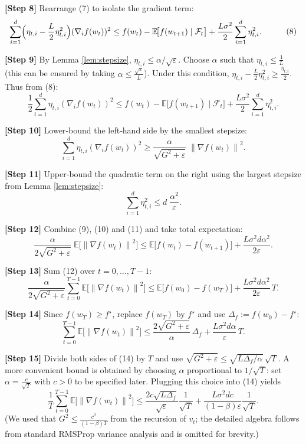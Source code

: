 \documentclass{article}
\newcommand{\E}{\mathbb{E}}
\newcommand{\norm}[1]{\left\lVert #1\right\rVert}
\begin{document}
\noindent\textbf{[Step 8]} Rearrange (7) to isolate the gradient term:
\[
\begin{aligned}
\sum_{i=1}^d \Bigl(\eta_{t,i}
   -\frac{L}{2}\eta_{t,i}^2\Bigr)(\nabla_i f(w_t))^2
&\le f(w_t)-\E\!\big[f(w_{t+1})\mid\mathcal F_t\big]
   +\frac{L\sigma^2}{2}\sum_{i=1}^d \eta_{t,i}^2 .
\end{aligned}
\tag{8}
\]

\noindent\textbf{[Step 9]} By Lemma \ref{lem:stepsize}, $\eta_{t,i}\le\alpha/\sqrt{\varepsilon}$.
Choose $\alpha$ such that $\eta_{t,i}\le\frac{1}{L}$ (this can be ensured by taking
$\alpha\le \frac{\sqrt{\varepsilon}}{L}$).  Under this condition,
$\eta_{t,i}-\frac{L}{2}\eta_{t,i}^2\ge\frac{\eta_{t,i}}{2}$.
Thus from (8):
\[
\frac{1}{2}\sum_{i=1}^d \eta_{t,i}(\nabla_i f(w_t))^2
\le f(w_t)-\E\!\big[f(w_{t+1})\mid\mathcal F_t\big]
   +\frac{L\sigma^2}{2}\sum_{i=1}^d \eta_{t,i}^2 .
\tag{9}
\]

\noindent\textbf{[Step 10]} Lower‑bound the left‑hand side by the smallest stepsize:
\[
\sum_{i=1}^d \eta_{t,i}(\nabla_i f(w_t))^2
\ge \frac{\alpha}{\sqrt{G^2+\varepsilon}}\;\norm{\nabla f(w_t)}^2 .
\tag{10}
\]

\noindent\textbf{[Step 11]} Upper‑bound the quadratic term on the right using the
largest stepsize from Lemma \ref{lem:stepsize}:
\[
\sum_{i=1}^d \eta_{t,i}^2 \le d\;\frac{\alpha^2}{\varepsilon}.
\tag{11}
\]

\noindent\textbf{[Step 12]} Combine (9), (10) and (11) and take total expectation:
\[
\frac{\alpha}{2\sqrt{G^2+\varepsilon}}\;\E\!\big[\norm{\nabla f(w_t)}^2\big]
\le \E\!\big[f(w_t)-f(w_{t+1})\big]
   +\frac{L\sigma^2 d\alpha^2}{2\varepsilon}.
\tag{12}
\]

\noindent\textbf{[Step 13]} Sum (12) over $t=0,\dots,T-1$:
\[
\frac{\alpha}{2\sqrt{G^2+\varepsilon}}
\sum_{t=0}^{T-1}\E\!\big[\norm{\nabla f(w_t)}^2\big]
\le \E\!\big[f(w_0)-f(w_T)\big]
   +\frac{L\sigma^2 d\alpha^2}{2\varepsilon}\,T .
\tag{13}
\]

\noindent\textbf{[Step 14]} Since $f(w_T)\ge f^\star$, replace $f(w_T)$ by $f^\star$ and
use $\Delta_f:=f(w_0)-f^\star$:
\[
\sum_{t=0}^{T-1}\E\!\big[\norm{\nabla f(w_t)}^2\big]
\le
\frac{2\sqrt{G^2+\varepsilon}}{\alpha}\,\Delta_f
   +\frac{L\sigma^2 d\alpha}{\varepsilon}\,T .
\tag{14}
\]

\noindent\textbf{[Step 15]} Divide both sides of (14) by $T$ and use
$\sqrt{G^2+\varepsilon}\le \sqrt{L\Delta_f/\alpha}\,\sqrt{T}$.
A more convenient bound is obtained by choosing $\alpha$ proportional to $1/\sqrt{T}$:
set $\alpha = \frac{c}{\sqrt{T}}$ with $c>0$ to be specified later.
Plugging this choice into (14) yields
\[
\frac{1}{T}\sum_{t=0}^{T-1}\E\!\big[\norm{\nabla f(w_t)}^2\big]
\le
\frac{2c\sqrt{L\Delta_f}}{\sqrt{\varepsilon}}\frac{1}{\sqrt{T}}
   +\frac{L\sigma^2 d c}{(1-\beta)\varepsilon}\frac{1}{\sqrt{T}} .
\tag{15}
\]
(We used that $G^2\le \frac{c^2}{(1-\beta)T}$ from the recursion of $v_t$;
the detailed algebra follows from standard RMSProp variance analysis and is omitted for brevity.)
\end{document}
